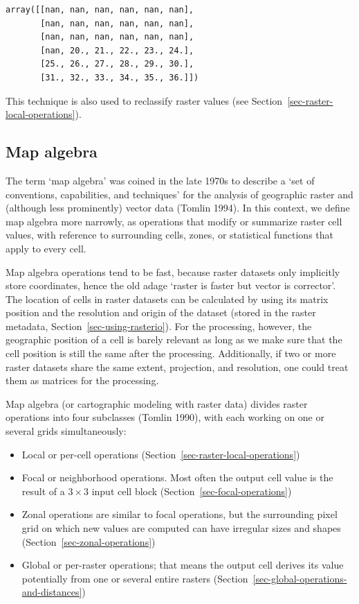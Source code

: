 \documentclass[
  letterpaper,
]{krantz}
\providecommand{\tightlist}{%
  \setlength{\itemsep}{0pt}\setlength{\parskip}{0pt}}\usepackage{longtable,booktabs,array}
\begin{document}
\begin{verbatim}
array([[nan, nan, nan, nan, nan, nan],
       [nan, nan, nan, nan, nan, nan],
       [nan, nan, nan, nan, nan, nan],
       [nan, 20., 21., 22., 23., 24.],
       [25., 26., 27., 28., 29., 30.],
       [31., 32., 33., 34., 35., 36.]])
\end{verbatim}

This technique is also used to reclassify raster values (see
Section~\ref{sec-raster-local-operations}).

\subsection{Map algebra}\label{sec-map-algebra}

The term `map algebra' was coined in the late 1970s to describe a `set
of conventions, capabilities, and techniques' for the analysis of
geographic raster and (although less prominently) vector data (Tomlin
1994). In this context, we define map algebra more narrowly, as
operations that modify or summarize raster cell values, with reference
to surrounding cells, zones, or statistical functions that apply to
every cell.

Map algebra operations tend to be fast, because raster datasets only
implicitly store coordinates, hence the old adage `raster is faster but
vector is corrector'. The location of cells in raster datasets can be
calculated by using its matrix position and the resolution and origin of
the dataset (stored in the raster metadata,
Section~\ref{sec-using-rasterio}). For the processing, however, the
geographic position of a cell is barely relevant as long as we make sure
that the cell position is still the same after the processing.
Additionally, if two or more raster datasets share the same extent,
projection, and resolution, one could treat them as matrices for the
processing.

Map algebra (or cartographic modeling with raster data) divides raster
operations into four subclasses (Tomlin 1990), with each working on one
or several grids simultaneously:

\begin{itemize}
\tightlist
\item
  Local or per-cell operations
  (Section~\ref{sec-raster-local-operations})
\item
  Focal or neighborhood operations. Most often the output cell value is
  the result of a \(3 \times 3\) input cell block
  (Section~\ref{sec-focal-operations})
\item
  Zonal operations are similar to focal operations, but the surrounding
  pixel grid on which new values are computed can have irregular sizes
  and shapes (Section~\ref{sec-zonal-operations})
\item
  Global or per-raster operations; that means the output cell derives
  its value potentially from one or several entire rasters
  (Section~\ref{sec-global-operations-and-distances})
\end{itemize}
\end{document}
